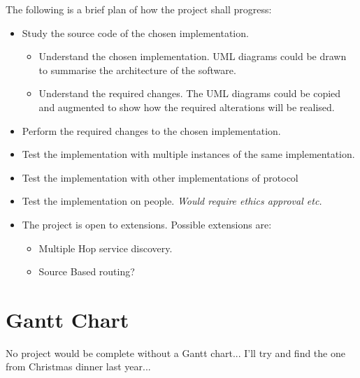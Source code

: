 \documentclass[12pt]{report}
\begin{document}
\em 

The following is a brief plan of how the project shall progress:

\begin{itemize}

\item Study the source code of the chosen implementation.

\begin{itemize}

\item Understand the chosen implementation.
UML diagrams could be drawn to summarise the architecture of the software. 

\item Understand the required changes.
The UML diagrams could be copied and augmented to show how the required
alterations will be realised. 

\end{itemize}

\item Perform the required changes to the chosen implementation.
\item Test the implementation with multiple instances of the same implementation.
\item Test the implementation with other implementations of protocol 
\item Test the implementation on people. \em Would require ethics approval etc. \em

\item The project is open to extensions. Possible extensions are:

\begin{itemize}
\item Multiple Hop service discovery.
\item Source Based routing?
\end{itemize}

\end{itemize}

\section{Gantt Chart}
No project would be complete without a Gantt chart... I'll try and find the one
from Christmas dinner last year...
\end{document}
